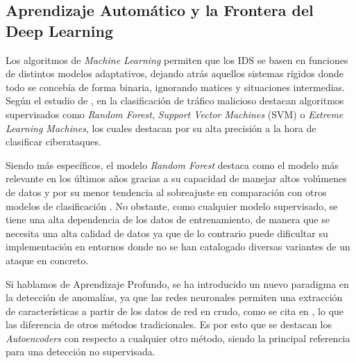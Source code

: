 \documentclass[12pt]{article}
\numberwithin{equation}{section} %
\begin{document}
    \vspace{10mm}

    \subsection{Aprendizaje Automático y la Frontera del Deep Learning}

    \vspace{5mm}

    Los algoritmos de \textit{Machine Learning} permiten que los IDS se basen en funciones de distintos modelos adaptativos, dejando atrás aquellos sistemas rígidos donde todo se concebía de forma binaria, ignorando matices y situaciones intermedias. Según el estudio de \cite{ahmad2021network}, en la clasificación de tráfico malicioso destacan algoritmos supervisados como \textit{Random Forest}, \textit{Support Vector Machines} (SVM) o \textit{Extreme Learning Machines}, los cuales destacan por su alta precisión a la hora de clasificar ciberataques.

    \vspace{5mm}

    Siendo más específicos, el modelo \textit{Random Forest} destaca como el modelo más relevante en los últimos años gracias a su capacidad de manejar altos volúmenes de datos y por su menor tendencia al sobreajuste en comparación con otros modelos de clasificación \cite{zafar2020survey}. No obstante, como cualquier modelo supervisado, se tiene una alta dependencia de los datos de entrenamiento, de manera que se necesita una alta calidad de datos ya que de lo contrario puede dificultar su implementación en entornos donde no se han catalogado diversas variantes de un ataque en concreto.

    \vspace{5mm}
 
    Si hablamos de Aprendizaje Profundo, se ha introducido un nuevo paradigma en la detección de anomalías, ya que las redes neuronales permiten una extracción de características a partir de los datos de red en crudo, como se cita en \cite{kwon2019survey}, lo que las diferencia de otros métodos tradicionales. Es por esto que se destacan los \textit{Autoencoders} con respecto a cualquier otro método, siendo la principal referencia para una detección no supervisada.

    \vspace{5mm}
\end{document}

